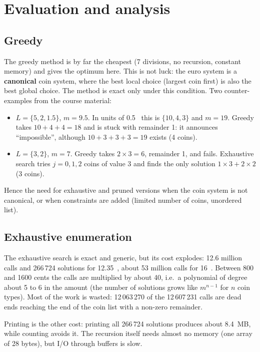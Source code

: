 \documentclass[11pt,a4paper]{article}
\begin{document}
\section{Evaluation and analysis}
\subsection{Greedy}
The greedy method is by far the cheapest (7 divisions, no recursion, constant memory) and gives the optimum here. This is not luck: the euro system is a \textbf{canonical} coin system, where the best local choice (largest coin first) is also the best global choice. The method is exact only under this condition. Two counter-examples from the course material:
\begin{itemize}
  \item $L=\{5,2,1.5\}$, $m=9.5$. In units of 0.5~\texteuro{} this is $\{10,4,3\}$ and $m=19$. Greedy takes $10+4+4=18$ and is stuck with remainder 1: it announces ``impossible'', although $10+3+3+3=19$ exists (4 coins).
  \item $L=\{3,2\}$, $m=7$. Greedy takes $2\times3=6$, remainder 1, and fails. Exhaustive search tries $j=0,1,2$ coins of value 3 and finds the only solution $1\times3+2\times2$ (3 coins).
\end{itemize}
Hence the need for exhaustive and pruned versions when the coin system is not canonical, or when constraints are added (limited number of coins, unordered list).

\subsection{Exhaustive enumeration}
The exhaustive search is exact and generic, but its cost explodes: 12.6 million calls and 266\,724 solutions for 12.35~\texteuro, about 53 million calls for 16~\texteuro. Between 800 and 1600 cents the calls are multiplied by about 40, i.e.\ a polynomial of degree about 5 to 6 in the amount (the number of solutions grows like $m^{n-1}$ for $n$ coin types). Most of the work is wasted: 12\,063\,270 of the 12\,607\,231 calls are dead ends reaching the end of the coin list with a non-zero remainder.

Printing is the other cost: printing all 266\,724 solutions produces about 8.4~MB, while counting avoids it. The recursion itself needs almost no memory (one array of 28 bytes), but I/O through buffers is slow.
\end{document}
